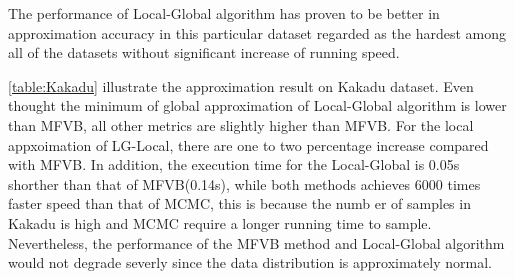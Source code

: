 The performance of Local-Global algorithm has proven to be better in approximation accuracy in this particular dataset regarded as the hardest among all of the datasets without significant increase of running speed.\\
\begin{table}[!h]
	\caption{Experiment Result on Kakadu dataset}
	\label{table:Kakadu}
\end{table}
\autoref{table:Kakadu} illustrate the approximation result on Kakadu dataset. Even thought the minimum of global approximation of Local-Global algorithm is lower than MFVB, all other metrics are slightly higher than MFVB. For the local appxoimation of LG-Local, there are one to two percentage increase compared with MFVB. In addition, the execution time for the Local-Global is 0.05s shorther than that of MFVB(0.14s), while both methods achieves 6000 times faster speed than that of MCMC, this is because the numb er of samples in Kakadu is high and MCMC require a longer running time to sample. Nevertheless, the performance of the MFVB method and Local-Global algorithm would not degrade severly since the data distribution is approximately normal.\\
\begin{table}[!h]
	\caption{Experiment Result on bodyfat dataset}
	\label{table:bodyfat}
\end{table}
